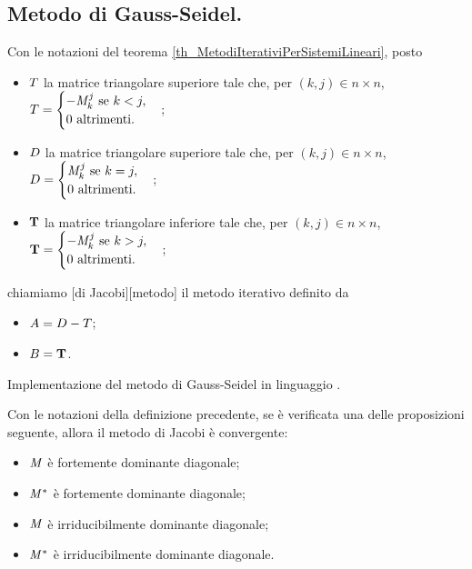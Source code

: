 \subsection{Metodo di Gauss-Seidel.}
\label{MetodiNumericiPerSistemiLineari_MetodoDiGaussSeidel}
\begin{Definition}
  Con le notazioni del teorema \ref{th_MetodiIterativiPerSistemiLineari},
  posto
  \begin{itemize}
    \item $T$ la matrice triangolare superiore tale che,
      per $(k,j) \in n \times n$,
      $T =
        \begin{cases}
          - \mathit{M}_k^j\text{ se }k < j,\\
          0\text{ altrimenti}.
        \end{cases}$;
    \item $D$ la matrice triangolare superiore tale che,
      per $(k,j) \in n \times n$,
      $D =
        \begin{cases}
          \mathit{M}_k^j\text{ se }k = j,\\
          0\text{ altrimenti}.
        \end{cases}$;
    \item $\mathbf{T}$ la matrice triangolare inferiore tale che,
      per $(k,j) \in n \times n$,
      $\mathbf{T} =
        \begin{cases}
          - \mathit{M}_k^j\text{ se }k > j,\\
          0\text{ altrimenti}.
        \end{cases}$;
  \end{itemize}
  chiamiamo
  [di Jacobi][metodo]
  il metodo iterativo definito da
  \begin{itemize}
    \item $A = D - T$;
    \item $B = \mathbf{T}$.
  \end{itemize}
\end{Definition}
\begin{listing}
	\caption{Implementazione del metodo di Gauss-Seidel in linguaggio .}
\end{listing}
\begin{Theorem}
  Con le notazioni della definizione precedente,
  se \`e verificata una delle proposizioni seguente, allora
  il metodo di Jacobi \`e convergente:
  \begin{itemize}
    \item $\mathit{M}$ \`e fortemente dominante diagonale;
    \item ${\mathit{M}}^*$ \`e fortemente dominante diagonale;
    \item $\mathit{M}$ \`e irriducibilmente dominante diagonale;
    \item ${\mathit{M}}^*$ \`e irriducibilmente dominante diagonale.
  \end{itemize}
\end{Theorem}
